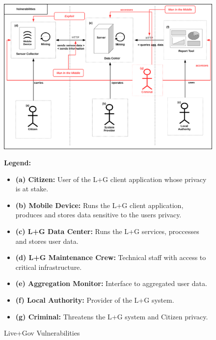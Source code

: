 \begin{figure}
\centering
\includegraphics[width=\textwidth]{diagrams/png/vulnerabilities.png}

\begin{flushleft}
\scriptsize
\textbf{Legend:}

\begin{itemize}
\itemsep1pt\parskip0pt
\item
  \textbf{(a) Citizen:} User of the L+G client application whose privacy
  is at stake.
\item
  \textbf{(b) Mobile Device:} Runs the L+G client application, produces
  and stores data sensitive to the users privacy.
\item
  \textbf{(c) L+G Data Center:} Runs the L+G services, proccesses and
  stores user data.
\item
  \textbf{(d) L+G Maintenance Crew:} Technical staff with access to
  critical infrastructure.
\item
  \textbf{(e) Aggregation Monitor:} Interface to aggregated user data.
\item
  \textbf{(f) Local Authority:} Provider of the L+G system.
\item
  \textbf{(g) Criminal:} Threatens the L+G system and Citizen privacy.
\end{itemize}
\end{flushleft}

\caption{Live+Gov Vulnerabilities}
\label{figure:Live+Gov Vulnerabilities}
\end{figure}
